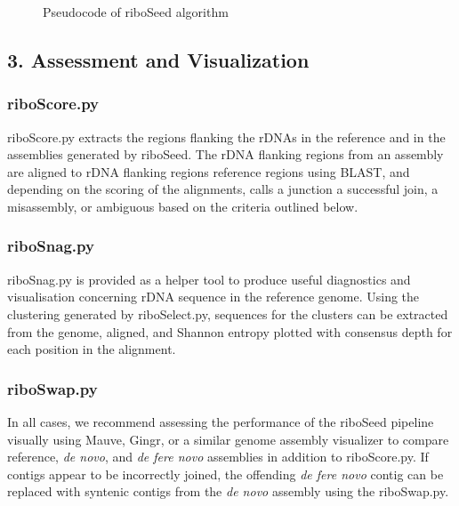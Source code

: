 \documentclass[10pt]{article}
\begin{document}
\begin{linenumbers}
\begin{figure}[h]
\begin{minipage}{.6\linewidth}
\begin{algorithm}[H]
    \end{algorithm}
  \end{minipage}
  \label{fig:algo}
  \caption{Pseudocode of riboSeed algorithm}
\end{figure}


\subsection*{3. Assessment and Visualization}
\subsubsection*{riboScore.py}
riboScore.py extracts the regions flanking the rDNAs in the reference and in the assemblies generated by riboSeed. The rDNA flanking regions from an assembly are aligned to rDNA flanking regions reference regions using BLAST, and depending on the scoring of the alignments, calls a junction a successful join, a misassembly, or ambiguous based on the criteria outlined below.
\subsubsection*{riboSnag.py}
riboSnag.py is provided as a helper tool to produce useful diagnostics and visualisation concerning rDNA sequence in the reference genome. Using the clustering generated by riboSelect.py, sequences for the clusters can be extracted from the genome, aligned, and Shannon entropy \cite{Schmitt1997} plotted with consensus depth for each position in the alignment.
\subsubsection*{riboSwap.py}
In all cases, we recommend assessing the performance of the riboSeed pipeline visually using Mauve\cite{Darling2004,Darling2011}, Gingr\cite{Treangen2014}, or a similar genome assembly visualizer to compare reference, \textit{de novo}, and \textit{de fere novo} assemblies in addition to riboScore.py. If contigs appear to be incorrectly joined, the offending \textit{de fere novo} contig can be replaced with syntenic contigs from the \textit{de novo} assembly using the riboSwap.py.



\end{linenumbers}
\end{document}
